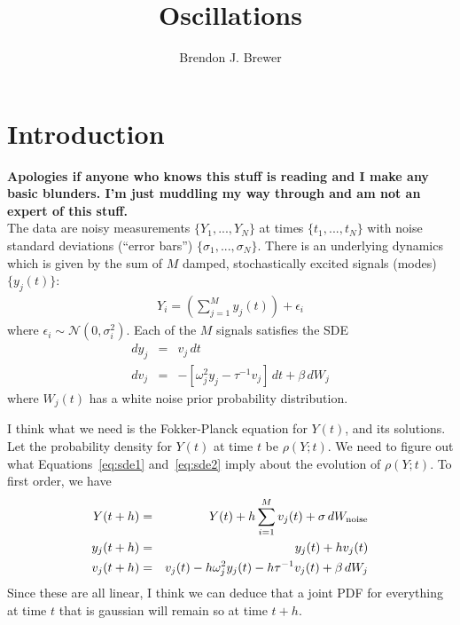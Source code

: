 \documentclass[letterpaper, 11pt]{article}
\title{Oscillations}
\author{Brendon J. Brewer}
\begin{document}
\maketitle

\section{Introduction}
{\bf Apologies if anyone who knows this stuff is reading and I make any basic
blunders. I'm just muddling my way through and am not an expert of this stuff.}\\

The data are noisy measurements $\{Y_1, ..., Y_N\}$ at times
$\{t_1, ..., t_N\}$ with noise standard deviations (``error bars'')
$\{\sigma_1, ..., \sigma_N\}$. There is an underlying dynamics which is
given by the sum of $M$ damped, stochastically excited signals (modes)
$\{y_j(t)\}$:
\begin{eqnarray}
Y_i = \left(\sum_{j=1}^M y_j(t)\right) + \epsilon_i
\end{eqnarray}
where $\epsilon_i \sim \mathcal{N}(0, \sigma_i^2)$.
Each of the $M$ signals satisfies the SDE
\begin{eqnarray}
dy_j &=& v_j \,dt\label{eq:sde1}\\
dv_j &=& -\left[\omega_j^2y_j - \tau^{-1}v_j\right] \,dt + \beta \,dW_j\label{eq:sde2}
\end{eqnarray}
where $W_j(t)$ has a white noise prior probability distribution.

I think what we need is the Fokker-Planck equation for $Y(t)$, and its
solutions. Let the probability density for $Y(t)$ at time $t$ be
$\rho(Y; t)$. We need to figure out what Equations~\ref{eq:sde1}
and~\ref{eq:sde2} imply about the evolution of $\rho(Y; t)$.
To first order, we have
\begin{eqnarray}
Y(t+h) &=& Y(t) + h\sum_{i=1}^M v_j(t) + \sigma\,dW_{\rm noise}\\
y_j(t + h) &=& y_j(t) + h v_j(t)\\
v_j(t + h) &=& v_j(t) - h\omega_j^2y_j(t) - h\tau^{-1}v_j(t) + \beta \,dW_j
\end{eqnarray}
Since these are all linear, I think we can deduce that a joint PDF for
everything at time $t$ that is gaussian will remain so at time $t+h$.
\end{document}
